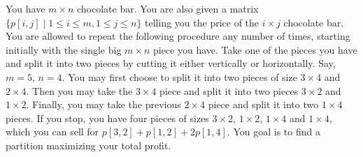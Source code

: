 \documentclass[11pt]{article}
\begin{document}
You have $m\times n$ chocolate bar. You are also given a matrix
$\{p[i,j]\mid 1\le i\le m, 1\le j\le n\}$ telling you the price of the
$i\times j$ chocolate bar. You are allowed to repeat the following
procedure any number of times, starting initially with the single big
$m\times n$ piece you have. Take one of the pieces you have and split
it into two pieces by cutting it either vertically or
horizontally. Say, $m=5$, $n=4$. You may first choose to split it into
two pieces of size $3\times 4$ and $2\times 4$. Then you may take the
$3\times 4$ piece and split it into two pieces $3\times 2$ and
$1\times 2$. Finally, you may take the previous $2\times 4$ piece and
split it into two $1\times 4$ pieces. If you stop, you have
four pieces of sizes $3\times 2$, $1\times 2$, $1\times 4$ and
$1\times 4$, which you can sell for $p[3,2]+p[1,2]+2p[1,4]$.
You goal is to find a partition maximizing your total profit.
\end{document}
